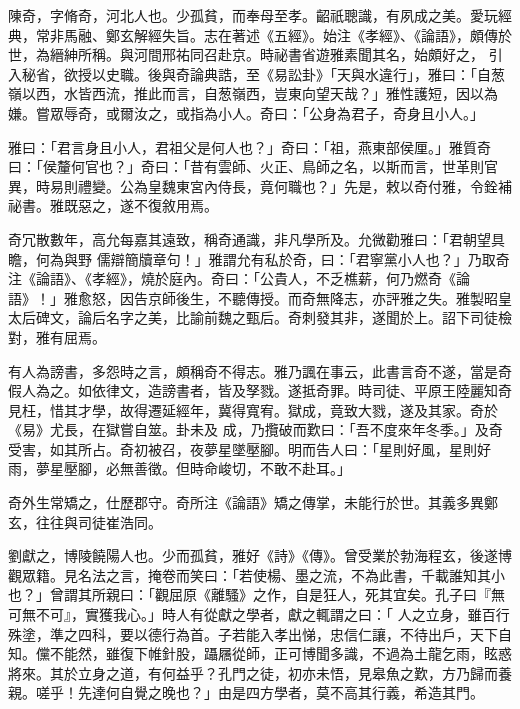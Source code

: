 \begin{pinyinscope}
 陳奇，字脩奇，河北人也。少孤貧，而奉母至孝。齠祇聰識，有夙成之美。愛玩經典，常非馬融、鄭玄解經失旨。志在著述《五經》。始注《孝經》、《論語》，頗傳於世，為縉紳所稱。與河間邢祐同召赴京。時祕書省遊雅素聞其名，始頗好之，
 引入秘省，欲授以史職。後與奇論典誥，至《易訟卦》「天與水違行」，雅曰：「自葱嶺以西，水皆西流，推此而言，自葱嶺西，豈東向望天哉？」雅性護短，因以為嫌。嘗眾辱奇，或爾汝之，或指為小人。奇曰：「公身為君子，奇身且小人。」



 雅曰：「君言身且小人，君祖父是何人也？」奇曰：「祖，燕東部侯厘。」雅質奇曰：「侯釐何官也？」奇曰：「昔有雲師、火正、鳥師之名，以斯而言，世革則官異，時易則禮變。公為皇魏東宮內侍長，竟何職也？」先是，敕以奇付雅，令銓補祕書。雅既惡之，遂不復敘用焉。



 奇冗散數年，高允每嘉其遠致，稱奇通識，非凡學所及。允微勸雅曰：「君朝望具瞻，何為與野
 儒辯簡牘章句！」雅謂允有私於奇，曰：「君寧黨小人也？」乃取奇注《論語》、《孝經》，燒於庭內。奇曰：「公貴人，不乏樵薪，何乃燃奇《論語》！」雅愈怒，因告京師後生，不聽傳授。而奇無降志，亦評雅之失。雅製昭皇太后碑文，論后名字之美，比諭前魏之甄后。奇刺發其非，遂聞於上。詔下司徒檢對，雅有屈焉。



 有人為謗書，多怨時之言，頗稱奇不得志。雅乃諷在事云，此書言奇不遂，當是奇假人為之。如依律文，造謗書者，皆及孥戮。遂抵奇罪。時司徒、平原王陸麗知奇見枉，惜其才學，故得遷延經年，冀得寬宥。獄成，竟致大戮，遂及其家。奇於《易》尤長，在獄嘗自筮。卦未及
 成，乃攬破而歎曰：「吾不度來年冬季。」及奇受害，如其所占。奇初被召，夜夢星墜壓腳。明而告人曰：「星則好風，星則好雨，夢星壓腳，必無善徵。但時命峻切，不敢不赴耳。」



 奇外生常矯之，仕歷郡守。奇所注《論語》矯之傳掌，未能行於世。其義多異鄭玄，往往與司徒崔浩同。



 劉獻之，博陵饒陽人也。少而孤貧，雅好《詩》《傳》。曾受業於勃海程玄，後遂博觀眾籍。見名法之言，掩卷而笑曰：「若使楊、墨之流，不為此書，千載誰知其小也？」曾謂其所親曰：「觀屈原《離騷》之作，自是狂人，死其宜矣。孔子曰『無可無不可』，實獲我心。」時人有從獻之學者，獻之輒謂之曰：「
 人之立身，雖百行殊塗，準之四科，要以德行為首。子若能入孝出悌，忠信仁讓，不待出戶，天下自知。儻不能然，雖復下帷針股，躡屩從師，正可博聞多識，不過為土龍乞雨，眩惑將來。其於立身之道，有何益乎？孔門之徒，初亦未悟，見皋魚之歎，方乃歸而養親。嗟乎！先達何自覺之晚也？」由是四方學者，莫不高其行義，希造其門。




\end{pinyinscope}
